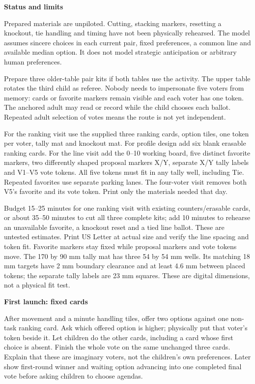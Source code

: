 \documentclass[11pt,letterpaper]{article}
\newcommand{\heading}[1]{\par\vspace{4pt}{\large\bfseries #1}\par}
\newcommand{\sub}[1]{\par\textbf{#1}\par}
\begin{document}
\sub{Status and limits}
Prepared materials are unpiloted. Cutting, stacking markers, resetting a knockout, tie handling and timing have not been physically rehearsed. The model assumes sincere choices in each current pair, fixed preferences, a common line and available median option. It does not model strategic anticipation or arbitrary human preferences.
\newpage
\heading{Preparation and launch}
Prepare three older-table pair kits if both tables use the activity. The upper table rotates the third child as referee. Nobody needs to impersonate five voters from memory: cards or favorite markers remain visible and each voter has one token. The anchored adult may read or record while the child chooses each ballot. Repeated adult selection of votes means the route is not yet independent.

For the ranking visit use the supplied three ranking cards, option tiles, one token per voter, tally mat and knockout mat. For profile design add six blank erasable ranking cards. For the line visit add the 0--10 working board, five distinct favorite markers, two differently shaped proposal markers X/Y, separate X/Y tally labels and V1--V5 vote tokens. All five tokens must fit in any tally well, including Tie. Repeated favorites use separate parking lanes. The four-voter visit removes both V5's favorite and its vote token. Print only the materials needed that day.

Budget 15--25 minutes for one ranking visit with existing counters/erasable cards, or about 35--50 minutes to cut all three complete kits; add 10 minutes to rehearse an unavailable favorite, a knockout reset and a tied line ballot. These are untested estimates. Print US Letter at actual size and verify the line spacing and token fit. Favorite markers stay fixed while proposal markers and vote tokens move. The 170 by 90 mm tally mat has three 54 by 54 mm wells. Its matching 18 mm targets have 2 mm boundary clearance and at least 4.6 mm between placed tokens; the separate tally labels are 23 mm squares. These are digital dimensions, not a physical fit test.

\sub{First launch: fixed cards}
After movement and a minute handling tiles, offer two options against one non-task ranking card. Ask which offered option is higher; physically put that voter's token beside it. Let children do the other cards, including a card whose first choice is absent. Finish the whole vote on the same unchanged three cards. Explain that these are imaginary voters, not the children's own preferences. Later show first-round winner and waiting option advancing into one completed final vote before asking children to choose agendas.
\end{document}
